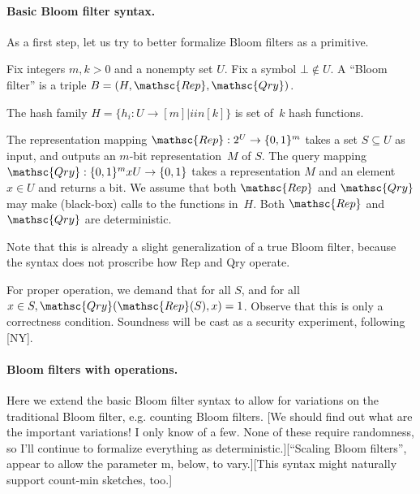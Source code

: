 \paragraph{Basic Bloom filter syntax.}
As a first step, let us try to better formalize Bloom filters as a primitive.

Fix integers $m,k > 0$ and a nonempty set $U$.  Fix a symbol $\bot \not\in U$.  A “Bloom filter” is a triple  $B=(H,\mathsc{Rep},\mathsc{Qry})$.  

The hash family $H = \{h_i : U \rightarrow [m]  | i in [k]\}$ is  set of~$k$ hash functions.  

The representation mapping $\mathsc{Rep}: 2^U \rightarrow \bits^m$ takes a set $S \subseteq U$ as input, and outputs an $m$-bit representation~$M$ of $S$.  The query mapping $\mathsc{Qry}: \bits^m x U \rightarrow \bits$ takes a representation $M$ and an element $x \in U$ and returns a bit.  We assume that both $\mathsc{Rep}$ and $\mathsc{Qry}$ may make (black-box) calls to the functions in~$H$.  Both $\mathsc{Rep}$ and $\mathsc{Qry}$ are deterministic.

Note that this is already a slight generalization of a true Bloom filter, because the syntax does not proscribe how Rep and Qry operate.


For proper operation, we demand that for all $S$, and for all $x \in S, \mathsc{Qry}(\mathsc{Rep}(S),x)=1$.  Observe that this is only a correctness condition.  Soundness will be cast as a security experiment, following [NY].


\paragraph{Bloom filters with operations. }

Here we extend the basic Bloom filter syntax to allow for variations on the traditional Bloom filter, e.g. counting Bloom filters.  [We should find out what are the important variations! I only know of a few.  None of these require randomness, so I’ll continue to formalize everything as deterministic.][“Scaling Bloom filters”, appear to allow the parameter m, below, to vary.][This syntax might naturally support count-min sketches, too.]

